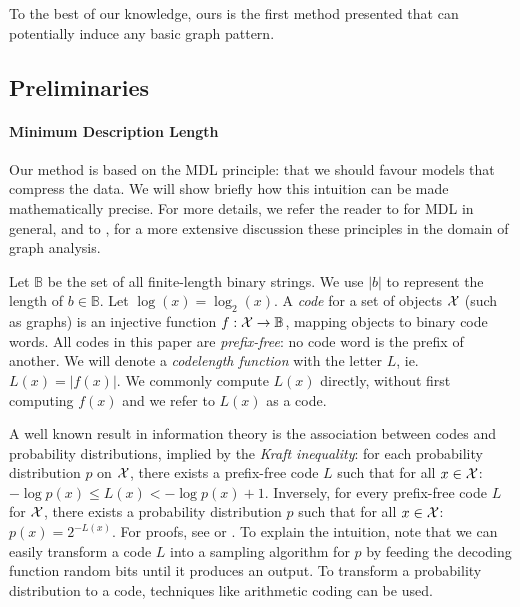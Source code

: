 \documentclass[letterpaper]{article} %
\newcommand{\B}{{\mathbb B}}
\begin{document}
To the best of our knowledge, ours is the first method presented that can potentially induce any basic graph pattern.

\subsection{Preliminaries}

\paragraph{Minimum Description Length}
Our method is based on the MDL principle: that we should favour models that compress the data. We will show briefly how this intuition can be made mathematically precise. For more details, we refer the reader to \cite{grunwald2007minimum} for MDL in general, and to \cite{bloem2017large}, for a more extensive discussion these principles in the domain of graph analysis.
 
Let $\B$ be the set of all finite-length binary strings. We use $|b|$ to represent the length of $b \in \B$. Let $\log(x) = \log_2(x)$. A \emph{code} for a set of objects $\cal X$ (such as graphs) is an injective function $f: {\cal X} \to \B$, mapping objects to binary code words. All codes in this paper are \emph{prefix-free}: no code word is the prefix of another. We will denote a \emph{codelength function} with the letter $L$, ie. $L(x) = |f(x)|$. We commonly compute $L(x)$ directly, without first computing $f(x)$ and we refer to $L(x)$ as a code.

A well known result in information theory is the association between codes and probability distributions, implied by the \emph{Kraft inequality}: for each probability distribution $p$ on $\cal X$, there exists a prefix-free code $L$ such that for all $x \in \cal X$: $- \log p(x) \leq L(x) < -\log p(x) + 1$. Inversely, for every prefix-free code $L$ for $\cal X$, there exists a probability distribution $p$ such that for all $x \in \cal X$: $p(x) = 2^{-L(x)}$. For proofs, see \cite[Section~3.2.1]{grunwald2007minimum} or \cite[Theorem~5.2.1]{cover2006elements}. To explain the intuition, note that we can easily transform a code $L$ into a sampling algorithm for $p$ by feeding the decoding function random bits until it produces an output. To transform a probability distribution to a code, techniques like arithmetic coding \cite{rissanen1979arithmetic} can be used.\footnotemark 
{}
\end{document}
